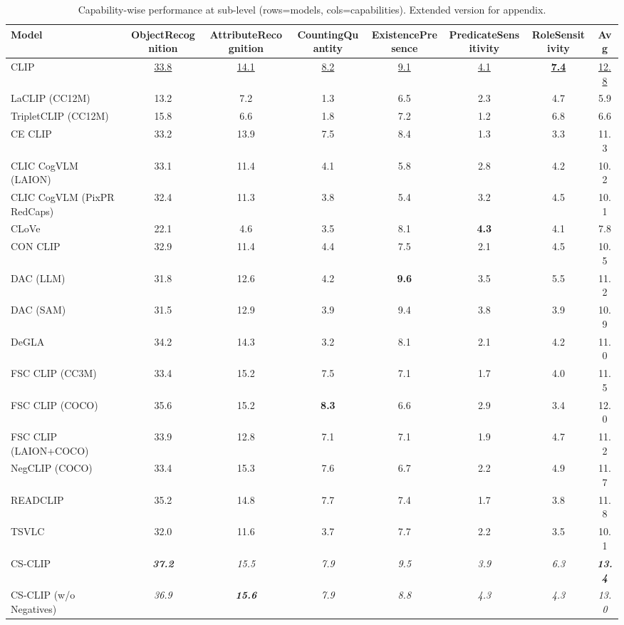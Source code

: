 \begin{table}[t]
  \centering
  \scriptsize
  \caption{Capability-wise performance at sub-level (rows=models, cols=capabilities). Extended version for appendix.}
  \label{tab:caps_sub_part1}
  \begin{adjustbox}{max width=\textwidth}
  \setlength{\tabcolsep}{2pt}
  \begin{tabular}{p{5.0cm}ccccccc}
    \toprule
    Model & ObjectRecognition & AttributeRecognition & CountingQuantity & ExistencePresence & PredicateSensitivity & RoleSensitivity & Avg \\
    \midrule
    CLIP & \underline{33.8} & \underline{14.1} & \underline{8.2} & \underline{9.1} & \underline{4.1} & \textbf{\underline{7.4}} & \underline{12.8} \\
    \midrule
    LaCLIP (CC12M) & 13.2 & 7.2 & 1.3 & 6.5 & 2.3 & 4.7 & 5.9 \\
    TripletCLIP (CC12M) & 15.8 & 6.6 & 1.8 & 7.2 & 1.2 & 6.8 & 6.6 \\
    \midrule
    CE CLIP & 33.2 & 13.9 & 7.5 & 8.4 & 1.3 & 3.3 & 11.3 \\
    CLIC CogVLM (LAION) & 33.1 & 11.4 & 4.1 & 5.8 & 2.8 & 4.2 & 10.2 \\
    CLIC CogVLM (PixPR RedCaps) & 32.4 & 11.3 & 3.8 & 5.4 & 3.2 & 4.5 & 10.1 \\
    CLoVe & 22.1 & 4.6 & 3.5 & 8.1 & \textbf{4.3} & 4.1 & 7.8 \\
    CON CLIP & 32.9 & 11.4 & 4.4 & 7.5 & 2.1 & 4.5 & 10.5 \\
    DAC (LLM) & 31.8 & 12.6 & 4.2 & \textbf{9.6} & 3.5 & 5.5 & 11.2 \\
    DAC (SAM) & 31.5 & 12.9 & 3.9 & 9.4 & 3.8 & 3.9 & 10.9 \\
    DeGLA & 34.2 & 14.3 & 3.2 & 8.1 & 2.1 & 4.2 & 11.0 \\
    FSC CLIP (CC3M) & 33.4 & 15.2 & 7.5 & 7.1 & 1.7 & 4.0 & 11.5 \\
    FSC CLIP (COCO) & 35.6 & 15.2 & \textbf{8.3} & 6.6 & 2.9 & 3.4 & 12.0 \\
    FSC CLIP (LAION+COCO) & 33.9 & 12.8 & 7.1 & 7.1 & 1.9 & 4.7 & 11.2 \\
    NegCLIP (COCO) & 33.4 & 15.3 & 7.6 & 6.7 & 2.2 & 4.9 & 11.7 \\
    READCLIP & 35.2 & 14.8 & 7.7 & 7.4 & 1.7 & 3.8 & 11.8 \\
    TSVLC & 32.0 & 11.6 & 3.7 & 7.7 & 2.2 & 3.5 & 10.1 \\
    \midrule
    CS-CLIP & \textbf{\emph{37.2}} & \emph{15.5} & \emph{7.9} & \emph{9.5} & \emph{3.9} & \emph{6.3} & \textbf{\emph{13.4}} \\
    CS-CLIP (w/o Negatives) & \emph{36.9} & \textbf{\emph{15.6}} & \emph{7.9} & \emph{8.8} & \emph{4.3} & \emph{4.3} & \emph{13.0} \\
    \bottomrule
  \end{tabular}
  \end{adjustbox}
\end{table}


